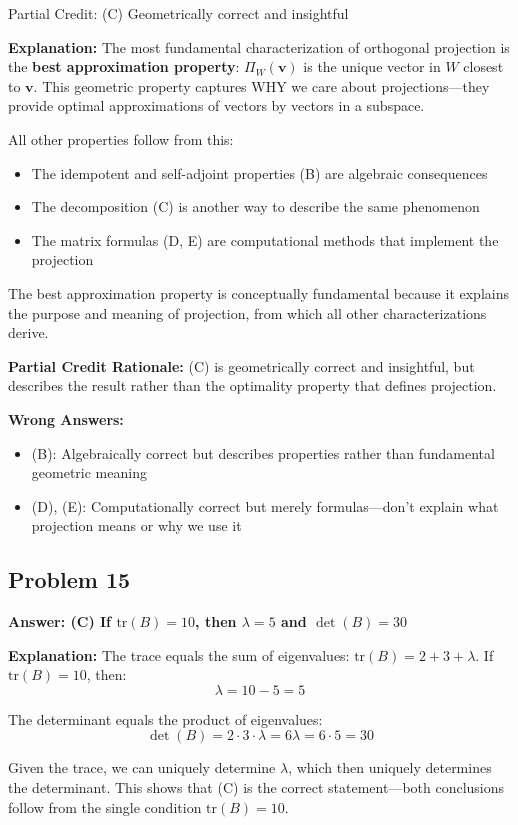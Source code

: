 \documentclass[12pt]{amsart}
\newcommand{\correct}[1]{{\color{correctgreen}\textbf{#1}}}
\newcommand{\partcred}[1]{{\color{partialblue}#1}}
\begin{document}
{\partcred{Partial Credit: (C) Geometrically correct and insightful}

\textbf{Explanation:} The most fundamental characterization of orthogonal projection is the \textbf{best approximation property}: $\Pi_W(\mathbf{v})$ is the unique vector in $W$ closest to $\mathbf{v}$. This geometric property captures WHY we care about projections—they provide optimal approximations of vectors by vectors in a subspace.

All other properties follow from this:
\begin{itemize}
\item The idempotent and self-adjoint properties (B) are algebraic consequences
\item The decomposition (C) is another way to describe the same phenomenon
\item The matrix formulas (D, E) are computational methods that implement the projection
\end{itemize}

The best approximation property is conceptually fundamental because it explains the purpose and meaning of projection, from which all other characterizations derive.

\textbf{Partial Credit Rationale:} (C) is geometrically correct and insightful, but describes the result rather than the optimality property that defines projection.

\textbf{Wrong Answers:}
\begin{itemize}
\item (B): Algebraically correct but describes properties rather than fundamental geometric meaning
\item (D), (E): Computationally correct but merely formulas—don't explain what projection means or why we use it
\end{itemize}

\subsection*{Problem 15}
\correct{Answer: (C) If $\text{tr}(B) = 10$, then $\lambda = 5$ and $\det(B) = 30$}

\textbf{Explanation:} The trace equals the sum of eigenvalues: $\text{tr}(B) = 2 + 3 + \lambda$. If $\text{tr}(B) = 10$, then:
$$\lambda = 10 - 5 = 5$$

The determinant equals the product of eigenvalues:
$$\det(B) = 2 \cdot 3 \cdot \lambda = 6\lambda = 6 \cdot 5 = 30$$

Given the trace, we can uniquely determine $\lambda$, which then uniquely determines the determinant. This shows that (C) is the correct statement—both conclusions follow from the single condition $\text{tr}(B) = 10$.

}
\end{document}
